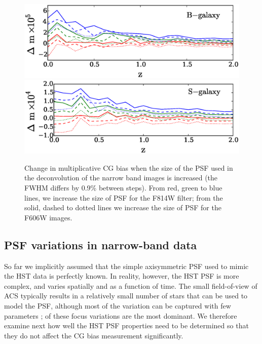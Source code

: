 \documentclass[useAMS,usenatbib]{mnras}
\begin{document}
\begin{figure}
\includegraphics[width=\hsize]{varpsfB.eps}
\includegraphics[width=\hsize]{varpsfS.eps}
\caption{Change in multiplicative CG bias when the size of the PSF used in the deconvolution
of the narrow band images is increased (the FWHM differs by 0.9\% between steps). From red,
green to blue lines, we increase the size of PSF for the F814W filter; from the solid, dashed to dotted
lines we  increase the size of PSF for the F606W images.}
\label{fig:psfacc1}
\end{figure}

\subsection{PSF variations in narrow-band data}
\label{sec:psfmodel}

So far we implicitly assumed that the simple axisymmetric PSF used to mimic the HST data
is perfectly known. In reality, however, the HST PSF is more complex, and varies spatially
and as a function of time. The small field-of-view of ACS typically results in a relatively small number
of stars that can be used to model the PSF, although most of the variation can be captured with
few parameters \citep[e.g.][]{Schrabback10}; of these focus variations are the most dominant. We therefore examine next how well the HST PSF  properties need to be determined so that they do not affect the CG bias measurement significantly.
\end{document}
